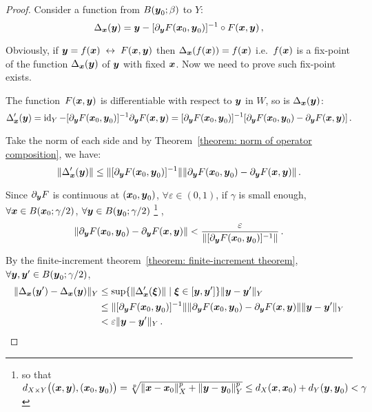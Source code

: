 \documentclass[openany]{book}
\begin{document}
\begin{proof}
	Consider a function from $B(\boldsymbol{y}_0; \beta)$ to $Y$: 
	\begin{equation*}
		\Delta_{\boldsymbol{x}} (\boldsymbol{y}) 
			= \boldsymbol{y} - [\partial_{\boldsymbol{y}} F(\boldsymbol{x}_0, \boldsymbol{y}_0)]^{-1} \circ F(\boldsymbol{x}, \boldsymbol{y})\,,
	\end{equation*}
	
	Obviously, if $\boldsymbol{y} = f(\boldsymbol{x}) \;\leftrightarrow\; F(\boldsymbol{x}, \boldsymbol{y})$ then $\Delta_{\boldsymbol{x}} (f(\boldsymbol{x})) = f(\boldsymbol{x})$ i.e.\ $f(\boldsymbol{x})$ is a fix-point of the function $\Delta_{\boldsymbol{x}} (\boldsymbol{y})$ of $\boldsymbol{y}$ with fixed $\boldsymbol{x}$. 
	Now we need to prove such fix-point exists.

	The function~$F(\boldsymbol{x}, \boldsymbol{y})$ is differentiable with respect to $\boldsymbol{y}$ in $W$, so is $\Delta_{\boldsymbol{x}}(\boldsymbol{y})$:
	\begin{equation*}
		\Delta_{\boldsymbol{x}}'(\boldsymbol{y}) 
		= \operatorname{id}_Y - [\partial_{\boldsymbol{y}} F(\boldsymbol{x}_0, \boldsymbol{y}_0)]^{-1} \partial_{\boldsymbol{y}} F(\boldsymbol{x}, \boldsymbol{y}) 
		= [\partial_{\boldsymbol{y}} F(\boldsymbol{x}_0, \boldsymbol{y}_0)]^{-1} [\partial_{\boldsymbol{y}} F(\boldsymbol{x}_0, \boldsymbol{y}_0) - \partial_{\boldsymbol{y}} F(\boldsymbol{x}, \boldsymbol{y})]\,.
	\end{equation*}

	Take the norm of each side and by Theorem~\ref{theorem: norm of operator composition}, we have:
	\begin{equation*}
		\|\Delta_{\boldsymbol{x}}'(\boldsymbol{y})\| 
			\leq \|[\partial_{\boldsymbol{y}} F(\boldsymbol{x}_0, \boldsymbol{y}_0)]^{-1}\|
			\|\partial_{\boldsymbol{y}} F(\boldsymbol{x}_0, \boldsymbol{y}_0) - \partial_{\boldsymbol{y}} F(\boldsymbol{x}, \boldsymbol{y})\|\,.
	\end{equation*}

	Since $\partial_{\boldsymbol{y}} F$ is continuous at $(\boldsymbol{x}_0, \boldsymbol{y}_0)$, $\forall \varepsilon \in (0, 1)$, if $\gamma$ is small enough, $\forall \boldsymbol{x} \in B(\boldsymbol{x}_0; \gamma/2)$, $\forall \boldsymbol{y} \in B(\boldsymbol{y}_0; \gamma/2)$%
	\footnote{so that $d_{X \times Y} \big((\boldsymbol{x}, \boldsymbol{y}), (\boldsymbol{x}_0, \boldsymbol{y}_0)\big) = \sqrt[p]{\|\boldsymbol{x} - \boldsymbol{x}_0\|_X^p + \|\boldsymbol{y} - \boldsymbol{y}_0\|_Y^p} \leq d_X(\boldsymbol{x}, \boldsymbol{x}_0) + d_Y(\boldsymbol{y}, \boldsymbol{y}_0) < \gamma$} , 
	\begin{equation*}
		\|\partial_{\boldsymbol{y}} F(\boldsymbol{x}_0, \boldsymbol{y}_0) - \partial_{\boldsymbol{y}} F(\boldsymbol{x}, \boldsymbol{y})\| 
			< \frac{\varepsilon}{\|[\partial_{\boldsymbol{y}} F(\boldsymbol{x}_0, \boldsymbol{y}_0)]^{-1}\|}\,.
	\end{equation*}
	
	By the finite-increment theorem~\ref{theorem: finite-increment theorem}, $\forall \boldsymbol{y}, \boldsymbol{y}' \in B(\boldsymbol{y}_0; \gamma/2)$, 
	\begin{align*}
		\|\Delta_{\boldsymbol{x}}(\boldsymbol{y}') - \Delta_{\boldsymbol{x}}(\boldsymbol{y})\|_Y 
			&\leq \sup\{\|\Delta_{\boldsymbol{x}}'(\boldsymbol{\xi})\| \mid \boldsymbol{\xi} \in [\boldsymbol{y}, \boldsymbol{y}']\}
				\|\boldsymbol{y} - \boldsymbol{y}'\|_Y
		\\
			&\leq \|[\partial_{\boldsymbol{y}} F(\boldsymbol{x}_0, \boldsymbol{y}_0)]^{-1}\|
			\|\partial_{\boldsymbol{y}} F(\boldsymbol{x}_0, \boldsymbol{y}_0) - \partial_{\boldsymbol{y}} F(\boldsymbol{x}, \boldsymbol{y})\|
			\|\boldsymbol{y} - \boldsymbol{y}'\|_Y
		\\
			&< \varepsilon \|\boldsymbol{y} - \boldsymbol{y}'\|_Y \,.
	\end{align*}
	

\end{proof}
\end{document}
